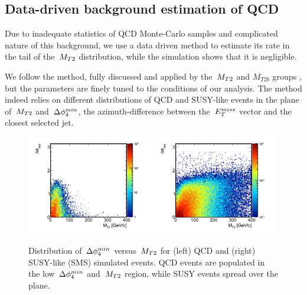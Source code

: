  
\subsection[QCD Estimation]{Data-driven background estimation of QCD}\label{subsect:qcd}

Due to inadequate statistics of QCD Monte-Carlo samples and complicated nature of this background, 
we use a data driven method to estimate its rate in the tail of the $\,{M_{T2}}$ distribution, while the simulation shows that it is 
negligible.

We follow the method, fully discussed and applied by the $\,{M_{T2}}$ and $M_{T2b}$ groups \cite{MT2_2011},
 but the parameters are finely tuned to the conditions of our analysis.
The method indeed relies on different distributions of QCD and SUSY-like events 
in the plane of $\,{M_{T2}}$ and $\,{\Delta\phi_{4}^{min}}$, 
the azimuth-difference between the $\,{E_T^{miss}}$ vector and the closest selected jet.

\begin{linenomath}
\begin{figure}[h]
\centering
\includegraphics[width=0.49\textwidth,keepaspectratio=true]{QCDFig/qcd_distribution.png}
\includegraphics[width=0.49\textwidth,keepaspectratio=true]{QCDFig/sms_distribution.png}
\caption[DPhi vs. MT2 Distribution]{Distribution of $\,{\Delta\phi_{4}^{min}}$ versus $\,{M_{T2}}$ for (left) QCD and 
(right) SUSY-like (SMS) simulated events. QCD events are populated in the low $\,{\Delta\phi_{4}^{min}}$ and $\,{M_{T2}}$ region, while
SUSY events spread over the plane.}
\label{fig:distributions}
\end{figure}
\end{linenomath}


